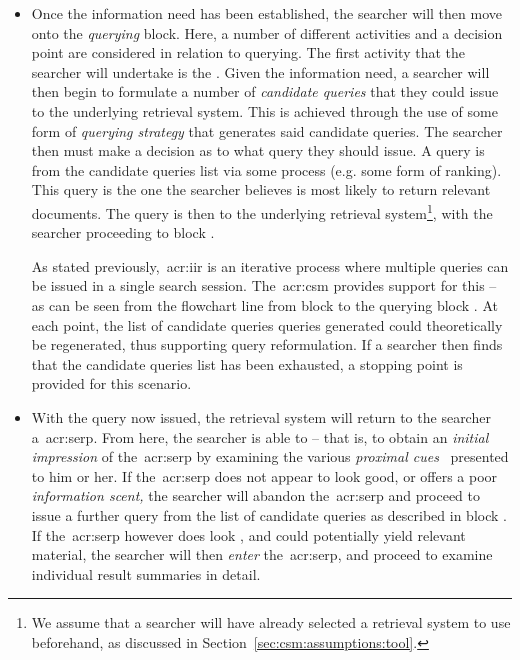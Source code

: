 \begin{itemize}
    
    \item[\blueboxbold{B}]{ Once the information need has been established, the searcher will then move onto the \emph{querying} block. Here, a number of different activities and a decision point are considered in relation to querying. The first activity that the searcher will undertake is the . Given the information need, a searcher will then begin to formulate a number of \emph{candidate queries} that they could issue to the underlying retrieval system. This is achieved through the use of some form of \emph{querying strategy} that generates said candidate queries. The searcher then must make a decision as to what query they should issue. A query is  from the candidate queries list via some process (e.g. some form of ranking). This query is the one the searcher believes is most likely to return relevant documents. The query is then  to the underlying retrieval system\footnote{We assume that a searcher will have already selected a retrieval system to use beforehand, as discussed in Section~\ref{sec:csm:assumptions:tool}.}, with the searcher proceeding to block .
    
    As stated previously,~\gls{acr:iir} is an iterative process where multiple queries can be issued in a single search session. The~\gls{acr:csm} provides support for this -- as can be seen from the flowchart line from block  to the querying block . At each point, the list of candidate queries queries generated could theoretically be regenerated, thus supporting query reformulation. If a searcher then finds that the candidate queries list has been exhausted, a stopping point is provided for this scenario.}
        
    \item[\blueboxbold{C}]{ With the query now issued, the retrieval system will return to the searcher a~\gls{acr:serp}. From here, the searcher is able to  -- that is, to obtain an \emph{initial impression} of the~\gls{acr:serp} by examining the various \emph{proximal cues}~\citep{chi2001information_scent} presented to him or her. If the~\gls{acr:serp} does not appear to look good, or offers a poor \emph{information scent,} the searcher will abandon the~\gls{acr:serp} and proceed to issue a further query from the list of candidate queries as described in block . If the~\gls{acr:serp} however does look , and could potentially yield relevant material, the searcher will then \emph{enter} the~\gls{acr:serp}, and proceed to examine individual result summaries in detail.}
    

\end{itemize}
